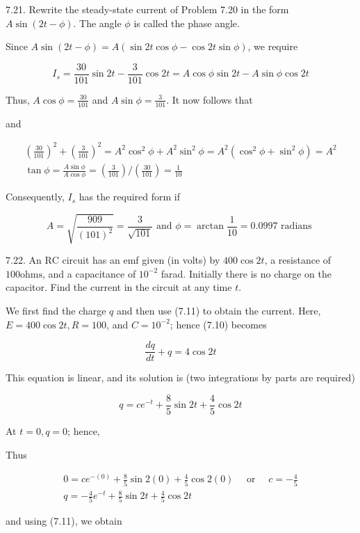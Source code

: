 \documentclass[10pt]{article}
\begin{document}
7.21. Rewrite the steady-state current of Problem 7.20 in the form $A \sin (2 t-\phi)$. The angle $\phi$ is called the phase angle.

Since $A \sin (2 t-\phi)=A(\sin 2 t \cos \phi-\cos 2 t \sin \phi)$, we require

$$
I_{s}=\frac{30}{101} \sin 2 t-\frac{3}{101} \cos 2 t=A \cos \phi \sin 2 t-A \sin \phi \cos 2 t
$$

Thus, $A \cos \phi=\frac{30}{101}$ and $A \sin \phi=\frac{3}{101}$. It now follows that

and

$$
\begin{gathered}
\left(\frac{30}{101}\right)^{2}+\left(\frac{3}{101}\right)^{2}=A^{2} \cos ^{2} \phi+A^{2} \sin ^{2} \phi=A^{2}\left(\cos ^{2} \phi+\sin ^{2} \phi\right)=A^{2} \\
\tan \phi=\frac{A \sin \phi}{A \cos \phi}=\left(\frac{3}{101}\right) /\left(\frac{30}{101}\right)=\frac{1}{10}
\end{gathered}
$$

Consequently, $I_{s}$ has the required form if

$$
A=\sqrt{\frac{909}{(101)^{2}}}=\frac{3}{\sqrt{101}} \text { and } \phi=\arctan \frac{1}{10}=0.0997 \text { radians }
$$

7.22. An $\mathrm{RC}$ circuit has an emf given (in volts) by $400 \cos 2 t$, a resistance of $100 \mathrm{ohms}$, and a capacitance of $10^{-2}$ farad. Initially there is no charge on the capacitor. Find the current in the circuit at any time $t$.

We first find the charge $q$ and then use (7.11) to obtain the current. Here, $E=400 \cos 2 t, R=100$, and $C=10^{-2}$; hence (7.10) becomes

$$
\frac{d q}{d t}+q=4 \cos 2 t
$$

This equation is linear, and its solution is (two integrations by parts are required)

$$
q=c e^{-t}+\frac{8}{5} \sin 2 t+\frac{4}{5} \cos 2 t
$$

At $t=0, q=0$; hence,

Thus

$$
\begin{gathered}
0=c e^{-(0)}+\frac{8}{5} \sin 2(0)+\frac{4}{5} \cos 2(0) \quad \text { or } \quad c=-\frac{4}{5} \\
q=-\frac{4}{5} e^{-t}+\frac{8}{5} \sin 2 t+\frac{4}{5} \cos 2 t
\end{gathered}
$$

and using (7.11), we obtain
\end{document}
